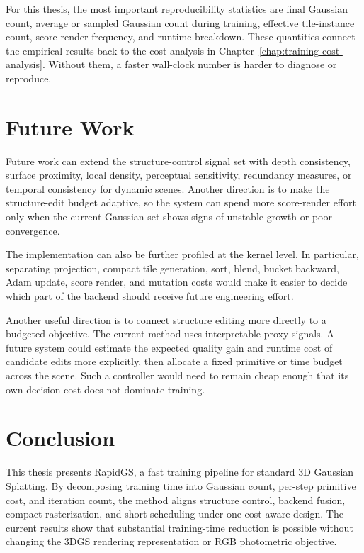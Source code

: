 For this thesis, the most important reproducibility statistics are final Gaussian count, average or sampled Gaussian count during training, effective tile-instance count, score-render frequency, and runtime breakdown. These quantities connect the empirical results back to the cost analysis in Chapter~\ref{chap:training-cost-analysis}. Without them, a faster wall-clock number is harder to diagnose or reproduce.

\section{Future Work}

Future work can extend the structure-control signal set with depth consistency, surface proximity, local density, perceptual sensitivity, redundancy measures, or temporal consistency for dynamic scenes. Another direction is to make the structure-edit budget adaptive, so the system can spend more score-render effort only when the current Gaussian set shows signs of unstable growth or poor convergence.

The implementation can also be further profiled at the kernel level. In particular, separating projection, compact tile generation, sort, blend, bucket backward, Adam update, score render, and mutation costs would make it easier to decide which part of the backend should receive future engineering effort.

Another useful direction is to connect structure editing more directly to a budgeted objective. The current method uses interpretable proxy signals. A future system could estimate the expected quality gain and runtime cost of candidate edits more explicitly, then allocate a fixed primitive or time budget across the scene. Such a controller would need to remain cheap enough that its own decision cost does not dominate training.

\section{Conclusion}

This thesis presents RapidGS, a fast training pipeline for standard 3D Gaussian Splatting. By decomposing training time into Gaussian count, per-step primitive cost, and iteration count, the method aligns structure control, backend fusion, compact rasterization, and short scheduling under one cost-aware design. The current results show that substantial training-time reduction is possible without changing the 3DGS rendering representation or RGB photometric objective.
